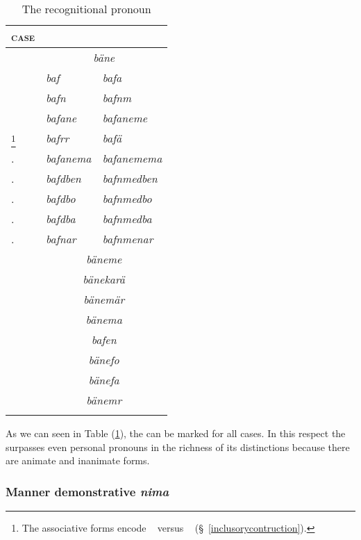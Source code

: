 \begin{table}
\caption{The recognitional pronoun}
\label{recogpron}
	\begin{tabularx}{\textwidth}{XXl}
		\lsptoprule
		\textsc{case}&\Sg{}&\Nsg{}\\ 
		\hline
		\Abs{}&\multicolumn{2}{|c|}{\emph{bäne}}\\\cline{2-3}
		\Erg{}&\emph{baf}&\emph{bafa}\\
		\Dat{}&\emph{bafn}&\emph{bafnm}\\
		\Poss{}&\emph{bafane}&\emph{bafaneme}\\
		\Assoc{}\footnote{The associative forms encode \Du~ versus \Pl~ (\S~\ref{inclusorycontruction}).}&\emph{bafrr}&\emph{bafä}\\
		\Char{}.\Anim{}&\emph{bafanema}&\emph{bafanemema}\\
		\Loc{}.\Anim{}&\emph{bafdben}&\emph{bafnmedben}\\
		\All{}.\Anim{}&\emph{bafdbo}&\emph{bafnmedbo}\\
		\Loc{}.\Anim{}&\emph{bafdba}&\emph{bafnmedba}\\
		\Purp{}.\Anim{}&\emph{bafnar}&\emph{bafnmenar}\\ \cline{2-3}
		\Ins{}&\multicolumn{2}{|c|}{\emph{bäneme}}\\\cline{2-3}
		\Prop{}&\multicolumn{2}{|c|}{\emph{bänekarä}}\\\cline{2-3}
		\Priv{}&\multicolumn{2}{|c|}{\emph{bänemär}}\\\cline{2-3}
		\Char{}&\multicolumn{2}{|c|}{\emph{bänema}}\\\cline{2-3}
		\Loc{}&\multicolumn{2}{|c|}{\emph{bafen}}\\\cline{2-3}
		\All{}&\multicolumn{2}{|c|}{\emph{bänefo}}\\\cline{2-3}
		\Loc{}&\multicolumn{2}{|c|}{\emph{bänefa}}\\ \cline{2-3}
		\Purp{}&\multicolumn{2}{|c|}{\emph{bänemr}}\\\cline{2-3}
		\lspbottomrule 
	\end{tabularx}
\end{table}%

As we can seen in Table (\ref{recogpron}), the  can be marked for all cases. In this respect the  surpasses even personal pronouns in the richness of its distinctions because there are animate and inanimate  forms.

\subsubsection{Manner demonstrative \emph{nima}} \label{manner-den-adv-nima}

